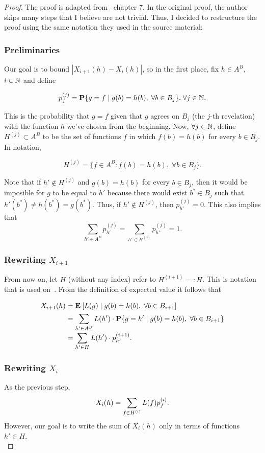 \begin{proof} The proof is adapted from~\cite{alon2016probabilistic} chapter 7. In the original proof, the author skips many steps that I believe are not trivial. Thus, I decided to restructure the proof using the same notation they used in the source material:

\subsubsection*{Preliminaries}
Our goal is to bound $|X_{i+1}(h) - X_{i}(h)|$, so in the first place, fix $h \in A^B$, $i\in \mathbb{N}$ and define

\[ p_{f}^{(j)} = \mathbf{P}\{g = f \;|\; g(b) = h(b),\; \forall b \in B_{j}\}.\; \forall j\in \mathbb{N}. \]

This is the probability that $g = f$ given that $g$ agrees on $B_j$ (the $j$-th revelation) with the function $h$ we've chosen from the beginning. Now, $\forall j\in \mathbb{N}$, define $H^{(j)}\subset A^B$ to be the set of functions $f$ in which $f(b) = h(b)$ for every $b \in B_{j}$. In notation,

\[ H^{(j)} = \{f \in A^B: f(b) = h(b),\; \forall b \in B_j\}. \] 

Note that if $h' \not\in H^{(j)}$ and $g(b) = h(b)$ for every $b\in B_{j}$, then it would be imposible for $g$ to be equal to $h'$ because there would exist $b^* \in B_{j}$ such that $h'(b^*) \neq h(b^*) = g(b^*)$. Thus, if $h' \not\in H^{(j)}$, then $p_{h'}^{(j)} = 0$. This also implies that 
\[\sum_{h' \in A^B} p_{h'}^{(j)} = \sum_{h' \in H^{(j)}} p_{h'}^{(j)} = 1. \] 

\subsubsection*{Rewriting $X_{i+1}$}
From now on, let $H$ (without any index) refer to $H^{(i+1)} =: H$. This is notation that is used on~\cite{alon2016probabilistic}. From the definition of expected value it follows that
\[\everymath{\displaystyle}\arraycolsep=1.4pt\def\arraystretch{1.5}
    \begin{array}{rcl}
    X_{i+1}(h) & = & \E[ L(g) \;|\; g(b) = h(b),\; \forall b\in B_{i+1} ] \\ 
    & = & \sum_{h' \in A^B} L(h') \cdot \P\{g = h' \;|\; g(b) = h(b),\; \forall b \in B_{i+1}\}\\
    & = & \sum_{h' \in H} L(h') \cdot p_{h'}^{(i+1)}.
\end{array}\]


\subsubsection*{Rewriting $X_i$}
As the previous step,
\[\everymath{\displaystyle}\arraycolsep=1.4pt\def\arraystretch{1.5}
    \begin{array}{rcl}
    X_{i}(h) & = & \sum_{f\in H^{(i)}} L(f) p_{f}^{(i)}.
\end{array}\]
However, our goal is to write the sum of $X_{i}(h)$ only in terms of functions $h' \in H$.\\[1em]


\end{proof}

